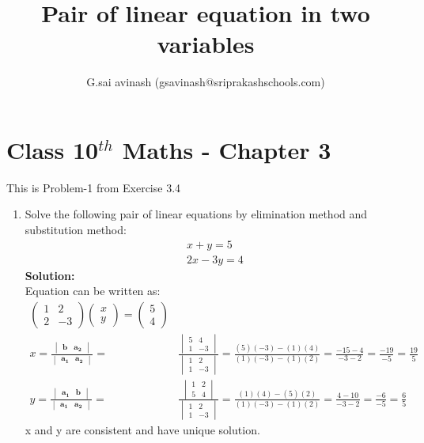 \documentclass[12pt]{article}
\title{Pair of linear equation in two variables}
\author{G.sai avinash (gsavinash@sriprakashschools.com)}
\newcommand{\myvec}[1]{\ensuremath{\begin{pmatrix}#1\end{pmatrix}}}
\newcommand{\mydet}[1]{\ensuremath{\begin{vmatrix}#1\end{vmatrix}}}
\newcommand{\solution}{\noindent \textbf{Solution: }}
\let\vec\mathbf
\begin{document}
\maketitle
\section*{Class 10$^{th}$ Maths - Chapter 3}
This is Problem-1 from Exercise 3.4
\begin{enumerate}
\item   Solve the following pair of linear equations by elimination method and substitution method:                         
\begin{align}
    x+y=5\\
        2x-3y=4
\end{align}
\solution\\
Equation can be written as:\\
\begin{align}
\myvec{1&2\\ 2&-3}\myvec{x\\y} = \myvec{5\\4}\\
x=\frac{{\mydet{ \vec{b} & \vec{a_2}}}}{\mydet{\vec{a_1} & 
\vec{a_2}}}=&\frac{\mydet{5 & 4 \\ 1 & -3}}{\mydet{1 &2 \\ 1 & -3}}=
\frac{(5)(-3) - (1)(4)}{(1)(-3) - (1)(2)}=
\frac{-15 -4}{-3-2}=
\frac{-19}{-5}=
\frac{19}{5}\\
y=\frac{{\mydet{ \vec{a_1} & \vec{b}}}}{\mydet{\vec{a_1} & 
\vec{a_2}}}=&\frac{\mydet{1 & 2 \\ 5 & 4}}{\mydet{1 &2 \\ 1 & -3}}=
\frac{(1)(4) - (5)(2)}{(1)(-3) - (1)(2)}=
\frac{4 -10}{-3-2}=
\frac{-6 }{-5}=
\frac{6}{5}
\end{align}
 x and y are consistent and have unique solution.










\end{enumerate}
\end{document}
